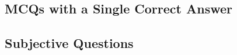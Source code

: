 \subsection*{MCQs with a Single Correct Answer}
\begin{enumerate}[label=\thesubsection.\arabic*,ref=\thesubsection.\theenumi]




\end{enumerate}
\subsection*{Subjective Questions}
\begin{enumerate}[label=\thesubsection.\arabic*,ref=\thesubsection.\theenumi]





\end{enumerate}
